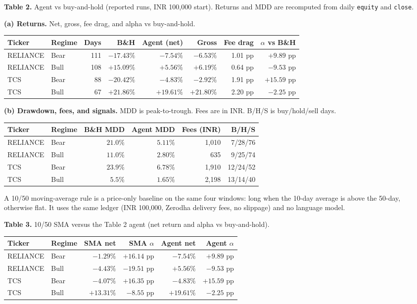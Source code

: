 \documentclass{article}
\begin{document}
\textbf{Table 2.} Agent vs buy-and-hold (reported runs, INR 100,000 start).
Returns and MDD are recomputed from daily \texttt{equity} and \texttt{close}.

\medskip
\noindent\textbf{(a) Returns.} Net, gross, fee drag, and alpha vs buy-and-hold.

{\footnotesize
\setlength{\tabcolsep}{4pt}
\begin{tabular}{@{} l l r r r r r r @{}}
\toprule
Ticker & Regime & Days & B\&H & Agent (net) & Gross & Fee drag & $\alpha$ vs B\&H \\
\midrule
RELIANCE & Bear & 111 & $-17.43\%$ & $-7.54\%$ & $-6.53\%$ & 1.01 pp & $+9.89$ pp \\
RELIANCE & Bull & 108 & $+15.09\%$ & $+5.56\%$ & $+6.19\%$ & 0.64 pp & $-9.53$ pp \\
TCS      & Bear &  88 & $-20.42\%$ & $-4.83\%$ & $-2.92\%$ & 1.91 pp & $+15.59$ pp \\
TCS      & Bull &  67 & $+21.86\%$ & $+19.61\%$ & $+21.80\%$ & 2.20 pp & $-2.25$ pp \\
\bottomrule
\end{tabular}
}

\medskip
\noindent\textbf{(b) Drawdown, fees, and signals.}
MDD is peak-to-trough. Fees are in INR. B/H/S is buy/hold/sell days.

{\footnotesize
\setlength{\tabcolsep}{5pt}
\begin{tabular}{@{} l l r r r r @{}}
\toprule
Ticker & Regime & B\&H MDD & Agent MDD & Fees (INR) & B/H/S \\
\midrule
RELIANCE & Bear & $21.0\%$ & $5.11\%$ & 1,010 & 7/28/76 \\
RELIANCE & Bull & $11.0\%$ & $2.80\%$ & 635   & 9/25/74 \\
TCS      & Bear & $23.9\%$ & $6.78\%$ & 1,910 & 12/24/52 \\
TCS      & Bull &  $5.5\%$ & $1.65\%$ & 2,198 & 13/14/40 \\
\bottomrule
\end{tabular}
}

A 10/50 moving-average rule is a price-only baseline on the same four windows: long when the 10-day average is above the 50-day, otherwise flat. It uses the same ledger (INR 100,000, Zerodha delivery fees, no slippage) and no language model.

\medskip
\noindent\textbf{Table 3.} 10/50 SMA versus the Table 2 agent (net return and alpha vs buy-and-hold).

\medskip
{\footnotesize
\setlength{\tabcolsep}{5pt}
\begin{tabular}{@{} l l r r r r @{}}
\toprule
Ticker & Regime & SMA net & SMA $\alpha$ & Agent net & Agent $\alpha$ \\
\midrule
RELIANCE & Bear & $-1.29\%$ & $+16.14$ pp & $-7.54\%$ & $+9.89$ pp \\
RELIANCE & Bull & $-4.43\%$ & $-19.51$ pp & $+5.56\%$ & $-9.53$ pp \\
TCS      & Bear & $-4.07\%$ & $+16.35$ pp & $-4.83\%$ & $+15.59$ pp \\
TCS      & Bull & $+13.31\%$ & $-8.55$ pp & $+19.61\%$ & $-2.25$ pp \\
\bottomrule
\end{tabular}
}
\end{document}
